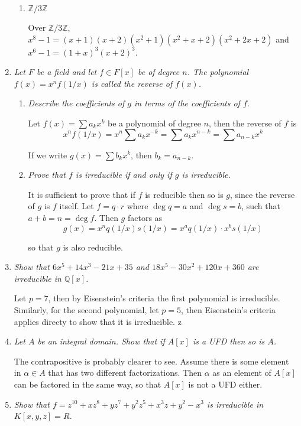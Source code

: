 \documentclass[10pt]{article}
\newcommand{\Z}{\mathbb{Z}}
\newcommand{\Q}{\mathbb{Q}}
\begin{document}
\begin{enumerate}
\begin{enumerate}
\item \emph{$\Z/3\Z$}

Over $\Z/3\Z$, $x^8-1 = (x+1)(x+2)(x^2+1)(x^2+x+2)(x^2+2x+2)$ and $x^6 - 1 = (1+x)^3(x+2)^3$.
\end{enumerate}

\item \emph{Let $F$ be a field and let $f \in F[x]$ be of degree $n$.  The polynomial $f(x) = x^nf(1/x)$ is called the \emph{reverse} of $f(x)$.}
\begin{enumerate}
\item \emph{Describe the coefficients of $g$ in terms of the coefficients of $f$.}

Let $f(x) = \sum a_k x^k$ be a polynomial of degree $n$, then the reverse of $f$ is
\[
x^n f(1/x) = x^n\sum a_k x^{-k} = \sum a_k x^{n-k} = \sum a_{n-k} x^k
\]

If we write $g(x) = \sum b_k x^k$, then $b_k = a_{n-k}$.

\item \emph{Prove that $f$ is irreducible if and only if $g$ is irreducible.}

It is sufficient to prove that if $f$ is reducible then so is $g$, since the reverse of $g$ is $f$ itself.  Let $f = q \cdot r$ where $\deg q = a$ and $\deg s = b$, such that $a+b = n = \deg f$.  Then $g$ factors as
\[
g(x) = x^n q(1/x)s(1/x) = x^aq(1/x) \cdot x^b s(1/x)
\]

so that $g$ is also reducible.

\end{enumerate}

\item \emph{Show that $6x^5 + 14x^3 - 21x + 35$ and $18x^5 - 30x^2 + 120x + 360$ are irreducible in $\Q[x]$.}

Let $p = 7$, then by Eisenstein's criteria the first polynomial is irreducible.    Similarly, for the second polynomial, let $p = 5$, then Eisenstein's criteria applies directy to show that it is irreducible.
z
\item \emph{Let $A$ be an integral domain.  Show that if $A[x]$ is a UFD then so is $A$.}

The contrapositive is probably clearer to see.  Assume there is some element in $\alpha \in A$ that has two different factorizations.  Then $\alpha$ as an element of $A[x]$ can be factored in the same way, so that $A[x]$ is not a UFD either.

\item \emph{Show that $f = z^{10} + xz^8 + yz^7 + y^2z^5 + x^3z + y^2 - x^3$ is irreducible in $K[x,y,z] = R$.}
\end{enumerate}
\end{document}
